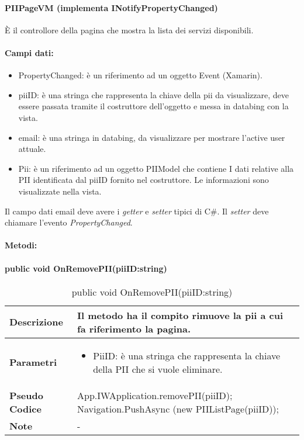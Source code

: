 \paragraph{PIIPageVM (implementa INotifyPropertyChanged)}
È il controllore della pagina che mostra la lista dei servizi disponibili.
\paragraph{Campi dati:}
\begin{itemize}
    \item PropertyChanged: è un riferimento ad un oggetto Event (Xamarin).
    \item piiID: è una stringa che rappresenta la chiave della pii da visualizzare, deve essere passata tramite il costruttore dell’oggetto e messa in databing con la vista.
    \item email: è una stringa in databing, da visualizzare per mostrare l’active user attuale. 
    \item Pii: è un riferimento ad un oggetto PIIModel che contiene I dati relative alla PII identificata dal piiID fornito nel costruttore. Le informazioni sono visualizzate nella vista.
\end{itemize}

Il campo dati email deve avere i \emph{getter} e \emph{setter} tipici di C\#. Il \emph{setter} deve chiamare l’evento \emph{PropertyChanged}.

\paragraph{Metodi:}
\paragraph{public void OnRemovePII(piiID:string)}
\begin{center}
    \begin{longtable}{|p{3cm}|p{9cm}|}%
    \caption{public void OnRemovePII(piiID:string)}
    \endfirsthead
    \endhead
    \hline
    \textbf{Descrizione} & Il metodo ha il compito rimuove la pii a cui fa riferimento la pagina.\\
    \hline
    \textbf{Parametri} &      
    \begin{itemize}
        \item PiiID: è una stringa che rappresenta la chiave della PII che si vuole eliminare.
    \end{itemize}
    \\
    \hline
    \textbf{Pseudo Codice} & 
    App.IWApplication.removePII(piiID);\newline
    Navigation.PushAsync (new PIIListPage(piiID));\newline
    \\
    \hline
    \textbf{Note} & 
    -
    \\
    \hline
    \end{longtable}
\end{center}




